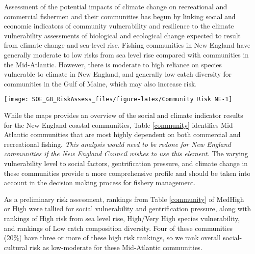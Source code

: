 \documentclass[11pt,]{article}
\let\origfigure\figure
\let\endorigfigure\endfigure
\renewenvironment{figure}[1][2] {
    \expandafter\origfigure\expandafter[H]
} {
    \endorigfigure
}
\begin{document}
Assessment of the potential impacts of climate change on recreational
and commercial fishermen and their communities has begun by linking
social and economic indicators of community vulnerability and resilience
to the climate vulnerability assessments of biological and ecological
change expected to result from climate change and sea-level rise.
Fishing communities in New England have generally moderate to low risks
from sea level rise compared with communities in the Mid-Atlantic.
However, there is moderate to high reliance on species vulnerable to
climate in New England, and generally low catch diversity for
communities in the Gulf of Maine, which may also increase risk.

\begin{figure}

{\centering \texttt{[image: SOE\_GB\_RiskAssess\_files/figure-latex/Community Risk NE-1]} 

}

\caption{Risks from sea level rise (A), reliance on climate-vulnerable species (B), and catch diversity (C) \label{commrisk}}\label{fig:Community Risk NE}
\end{figure}

While the maps provides an overview of the social and climate indicator
results for the New England coastal communities, Table \ref{community}
identifies Mid-Atlantic communities that are most highly dependent on
both commercial and recreational fishing. \emph{This analysis would need
to be redone for New England communities if the New England Council
wishes to use this element.} The varying vulnerability level to social
factors, gentrification pressure, and climate change in these
communities provide a more comprehensive profile and should be taken
into account in the decision making process for fishery management.

As a preliminary risk assessment, rankings from Table \ref{community} of
MedHigh or High were tallied for social vulnerability and gentrification
pressure, along with rankings of High risk from sea level rise,
High/Very High species vulnerability, and rankings of Low catch
composition diversity. Four of these communities (20\%) have three or
more of these high risk rankings, so we rank overall social-cultural
risk as low-moderate for these Mid-Atlantic communities.
\end{document}
